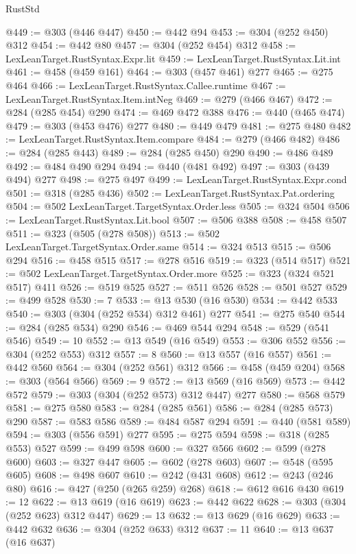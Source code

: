 \begin{lexlean}{RustStd}
\begin{coremodule}
@449 := @303 (@446 @447)
@450 := @442 @94
@453 := @304 (@252 @450) @312
@454 := @442 @80
@457 := @304 (@252 @454) @312
@458 := LexLeanTarget.RustSyntax.Expr.lit
@459 := LexLeanTarget.RustSyntax.Lit.int
@461 := @458 (@459 @161)
@464 := @303 (@457 @461) @277
@465 := @275 @464
@466 := LexLeanTarget.RustSyntax.Callee.runtime
@467 := LexLeanTarget.RustSyntax.Item.intNeg
@469 := @279 (@466 @467)
@472 := @284 (@285 @454) @290
@474 := @469 @472 @388
@476 := @440 (@465 @474)
@479 := @303 (@453 @476) @277
@480 := @449 @479
@481 := @275 @480
@482 := LexLeanTarget.RustSyntax.Item.compare
@484 := @279 (@466 @482)
@486 := @284 (@285 @443)
@489 := @284 (@285 @450) @290
@490 := @486 @489
@492 := @484 @490 @294
@494 := @440 (@481 @492)
@497 := @303 (@439 @494) @277
@498 := @275 @497
@499 := LexLeanTarget.RustSyntax.Expr.cond
@501 := @318 (@285 @436)
@502 := LexLeanTarget.RustSyntax.Pat.ordering
@504 := @502 LexLeanTarget.TargetSyntax.Order.less
@505 := @324 @504
@506 := LexLeanTarget.RustSyntax.Lit.bool
@507 := @506 @388
@508 := @458 @507
@511 := @323 (@505 (@278 @508))
@513 := @502 LexLeanTarget.TargetSyntax.Order.same
@514 := @324 @513
@515 := @506 @294
@516 := @458 @515
@517 := @278 @516
@519 := @323 (@514 @517)
@521 := @502 LexLeanTarget.TargetSyntax.Order.more
@525 := @323 (@324 @521 @517) @411
@526 := @519 @525
@527 := @511 @526
@528 := @501 @527
@529 := @499 @528
@530 := 7
@533 := @13 @530 (@16 @530)
@534 := @442 @533
@540 := @303 (@304 (@252 @534) @312 @461) @277
@541 := @275 @540
@544 := @284 (@285 @534) @290
@546 := @469 @544 @294
@548 := @529 (@541 @546)
@549 := 10
@552 := @13 @549 (@16 @549)
@553 := @306 @552
@556 := @304 (@252 @553) @312
@557 := 8
@560 := @13 @557 (@16 @557)
@561 := @442 @560
@564 := @304 (@252 @561) @312
@566 := @458 (@459 @204)
@568 := @303 (@564 @566)
@569 := 9
@572 := @13 @569 (@16 @569)
@573 := @442 @572
@579 := @303 (@304 (@252 @573) @312 @447) @277
@580 := @568 @579
@581 := @275 @580
@583 := @284 (@285 @561)
@586 := @284 (@285 @573) @290
@587 := @583 @586
@589 := @484 @587 @294
@591 := @440 (@581 @589)
@594 := @303 (@556 @591) @277
@595 := @275 @594
@598 := @318 (@285 @553) @527
@599 := @499 @598
@600 := @327 @566
@602 := @599 (@278 @600)
@603 := @327 @447
@605 := @602 (@278 @603)
@607 := @548 (@595 @605)
@608 := @498 @607
@610 := @242 (@431 @608)
@612 := @243 (@246 @80)
@616 := @427 (@250 (@265 @259) @268)
@618 := @612 @616 @430
@619 := 12
@622 := @13 @619 (@16 @619)
@623 := @442 @622
@628 := @303 (@304 (@252 @623) @312 @447)
@629 := 13
@632 := @13 @629 (@16 @629)
@633 := @442 @632
@636 := @304 (@252 @633) @312
@637 := 11
@640 := @13 @637 (@16 @637)

\end{coremodule}
\end{lexlean}
